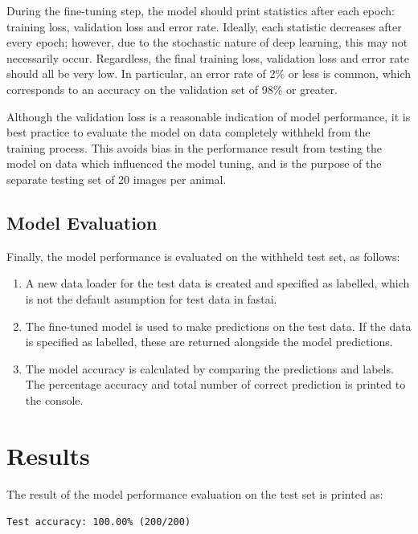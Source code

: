 During the fine-tuning step, the model should print statistics after each epoch: training loss, validation loss and error rate. Ideally, each statistic decreases after every epoch; however, due to the stochastic nature of deep learning, this may not necessarily occur. Regardless, the final training loss, validation loss and error rate should all be very low. In particular, an error rate of 2\% or less is common, which corresponds to an accuracy on the validation set of 98\% or greater.

Although the validation loss is a reasonable indication of model performance, it is best practice to evaluate the model on data completely withheld from the training process. This avoids bias in the performance result from testing the model on data which influenced the model tuning, and is the purpose of the separate testing set of 20 images per animal.

\subsection{Model Evaluation}

Finally, the model performance is evaluated on the withheld test set, as follows:

\begin{enumerate}
  \item A new data loader for the test data is created and specified as labelled, which is not the default asumption for test data in fastai.

  \item The fine-tuned model is used to make predictions on the test data. If the data is specified as labelled, these are returned alongside the model predictions.

  \item The model accuracy is calculated by comparing the predictions and labels. The percentage accuracy and total number of correct prediction is printed to the console.

\end{enumerate}

\section{Results}

The result of the model performance evaluation on the test set is printed as:

\begin{center}
  \texttt{Test accuracy: 100.00\% (200/200)}
\end{center}

